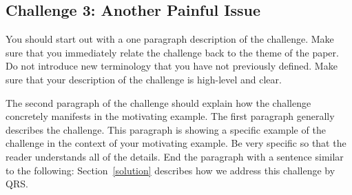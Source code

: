 \subsection{Challenge 3: Another Painful Issue}
\label{challenge3}

You should start out with a one paragraph description of
the challenge. Make sure that you immediately relate the
challenge back to the theme of the paper. Do not introduce
new terminology that you have not previously defined. Make
sure that your description of the challenge is high-level
and clear.

The second paragraph of the challenge should explain how
the challenge concretely manifests in the motivating example.
The first paragraph generally describes the challenge. This
paragraph is showing a specific example of the challenge in
the context of your motivating example. Be very specific
so that the reader understands all of the details. End
the paragraph with a sentence similar to the following:
Section~\ref{solution} describes how we address this
challenge by QRS.

 
